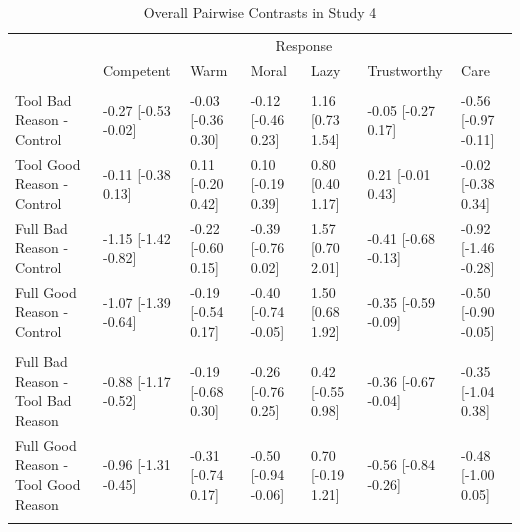 \documentclass[
  man,
  floatsintext,
  longtable,
  nolmodern,
  notxfonts,
  notimes,
  colorlinks=true,linkcolor=blue,citecolor=blue,urlcolor=blue]{apa7}
\begin{document}
\begin{landscape}

\begin{table}

{\caption{{Overall Pairwise Contrasts in Study 4
\vspace{20pt}}{\label{tbl-treatment-diffs-study4}}}
\vspace{-20pt}}

\begingroup\fontsize{8.5}{10.5}\selectfont

\begin{tabular}{lllllll}
\toprule
\multicolumn{1}{c}{ } & \multicolumn{6}{c}{Response} \\
\cmidrule(l{3pt}r{3pt}){2-7}
  & Competent & Warm & Moral & Lazy & Trustworthy & Care\\
\midrule
\addlinespace[0.3em]
\multicolumn{7}{l}{\textbf{Comparison to control}}\\
\hspace{1em}Tool Bad Reason - Control & -0.27 [-0.53 -0.02] & -0.03 [-0.36 0.30] & -0.12 [-0.46 0.23] & 1.16 [0.73 1.54] & -0.05 [-0.27 0.17] & -0.56 [-0.97 -0.11]\\
\hspace{1em}Tool Good Reason - Control & -0.11 [-0.38 0.13] & 0.11 [-0.20 0.42] & 0.10 [-0.19 0.39] & 0.80 [0.40 1.17] & 0.21 [-0.01 0.43] & -0.02 [-0.38 0.34]\\
\hspace{1em}Full Bad Reason - Control & -1.15 [-1.42 -0.82] & -0.22 [-0.60 0.15] & -0.39 [-0.76 0.02] & 1.57 [0.70 2.01] & -0.41 [-0.68 -0.13] & -0.92 [-1.46 -0.28]\\
\hspace{1em}Full Good Reason - Control & -1.07 [-1.39 -0.64] & -0.19 [-0.54 0.17] & -0.40 [-0.74 -0.05] & 1.50 [0.68 1.92] & -0.35 [-0.59 -0.09] & -0.50 [-0.90 -0.05]\\
\addlinespace[0.3em]
\multicolumn{7}{l}{\textbf{Effect of outsourcing type}}\\
\hspace{1em}Full Bad Reason - Tool Bad Reason & -0.88 [-1.17 -0.52] & -0.19 [-0.68 0.30] & -0.26 [-0.76 0.25] & 0.42 [-0.55 0.98] & -0.36 [-0.67 -0.04] & -0.35 [-1.04 0.38]\\
\hspace{1em}Full Good Reason - Tool Good Reason & -0.96 [-1.31 -0.45] & -0.31 [-0.74 0.17] & -0.50 [-0.94 -0.06] & 0.70 [-0.19 1.21] & -0.56 [-0.84 -0.26] & -0.48 [-1.00 0.05]\\
\addlinespace[0.3em]
\multicolumn{7}{l}{\textbf{Effect of reasons for outsourcing}}\\

\end{tabular}
\end{table}
\end{landscape}
\end{document}
